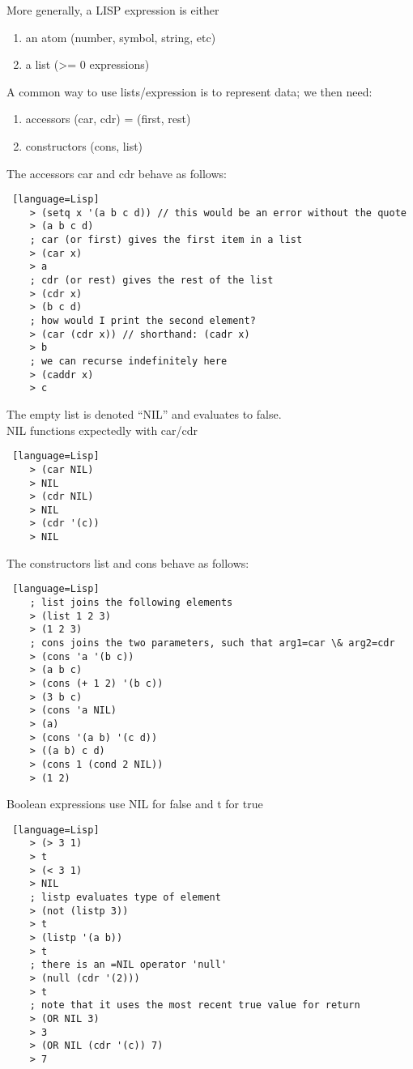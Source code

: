 \documentclass[../../lecture_notes.tex]{subfiles}
\begin{document}
\noindent More generally, a LISP expression is either
\begin{enumerate}
\item an atom (number, symbol, string, etc)
\item a list (>= 0 expressions)
\end{enumerate} \medskip

\noindent A common way to use lists/expression is to represent data; we then need:
\begin{enumerate}
\item accessors (car, cdr) = (first, rest)
\item constructors (cons, list)
\end{enumerate}
\noindent The accessors car and cdr behave as follows:
\begin{lstlisting} [language=Lisp]
	> (setq x '(a b c d)) // this would be an error without the quote
	> (a b c d)
	; car (or first) gives the first item in a list
	> (car x)
	> a
	; cdr (or rest) gives the rest of the list
	> (cdr x)
	> (b c d)
	; how would I print the second element?
	> (car (cdr x)) // shorthand: (cadr x)
	> b
	; we can recurse indefinitely here
	> (caddr x)
	> c
\end{lstlisting}
The empty list is denoted “NIL” and evaluates to false.\\
NIL functions expectedly with car/cdr
\begin{lstlisting} [language=Lisp]
	> (car NIL)
	> NIL
	> (cdr NIL)
	> NIL
	> (cdr '(c))
	> NIL
\end{lstlisting}

\noindent The constructors list and cons behave as follows:\\
\begin{lstlisting} [language=Lisp]
	; list joins the following elements
	> (list 1 2 3)
	> (1 2 3)
	; cons joins the two parameters, such that arg1=car \& arg2=cdr
	> (cons 'a '(b c))
	> (a b c)
	> (cons (+ 1 2) '(b c))
	> (3 b c)
	> (cons 'a NIL)
	> (a)
	> (cons '(a b) '(c d))
	> ((a b) c d)
	> (cons 1 (cond 2 NIL))
	> (1 2)
\end{lstlisting} \medskip

\noindent Boolean expressions use NIL for false and t for true
\begin{lstlisting} [language=Lisp]
	> (> 3 1)
	> t
	> (< 3 1)
	> NIL
	; listp evaluates type of element
	> (not (listp 3))
	> t
	> (listp '(a b))
	> t
	; there is an =NIL operator 'null'
	> (null (cdr '(2)))
	> t
	; note that it uses the most recent true value for return
	> (OR NIL 3)
	> 3
	> (OR NIL (cdr '(c)) 7)
	> 7
\end{lstlisting} \medskip
\end{document}
